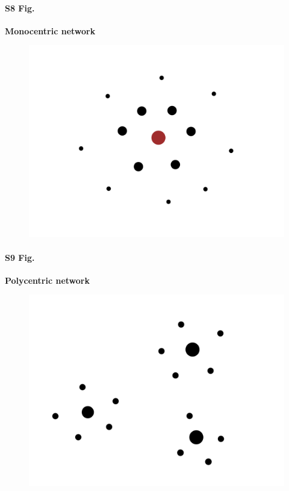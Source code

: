 \documentclass[10pt,letterpaper]{article}
\begin{document}
\paragraph*{S8 Fig.}
\label{SI:S8_fig}
{\bf Monocentric network}
\begin{figure}[ht!]{\textwidth}
    \includegraphics[width=\textwidth]{figures/maps/map_monocentric.pdf}
    \label{si:mono}
\end{figure}

\paragraph*{S9 Fig.}
\label{SI:S9_fig}
{\bf Polycentric network}
\begin{figure}[ht!]{\textwidth}
    \includegraphics[width=\textwidth]{figures/maps/map_polycentric.pdf}
    \label{si:poly}
\end{figure}
\end{document}
